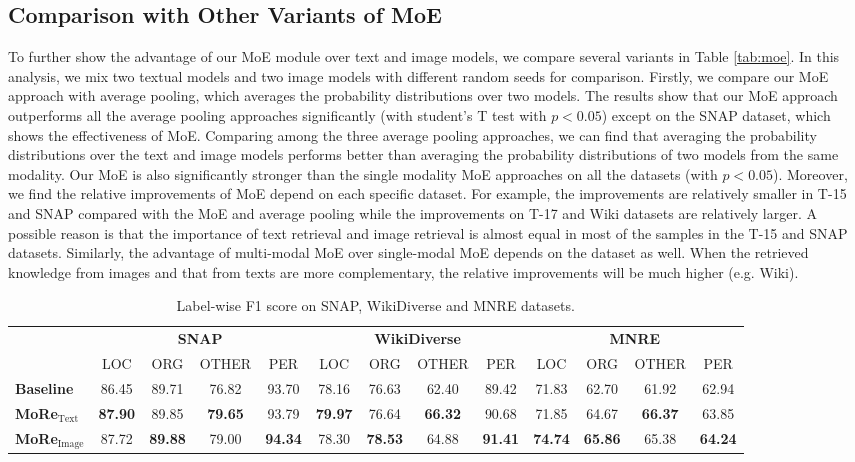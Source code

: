 \documentclass[11pt]{article}
\begin{document}
\subsection{Comparison with Other Variants of MoE}
To further show the advantage of our MoE module over text and image models, we compare several variants in Table \ref{tab:moe}. In this analysis, we mix two textual models and two image models with different random seeds for comparison. Firstly, we compare our MoE approach with average pooling, which averages the probability distributions over two models. The results show that our MoE approach outperforms all the average pooling approaches significantly (with student's T test with $p<0.05$) except on the SNAP dataset, which shows the effectiveness of MoE. Comparing among the three average pooling approaches, we can find that averaging the probability distributions over the text and image models performs better than averaging the probability distributions of two models from the same modality. Our MoE is also significantly stronger than the single modality MoE approaches on all the datasets (with $p<0.05$). 
Moreover, we find the relative improvements of MoE depend on each specific dataset. For example, the improvements are relatively smaller in T-15 and SNAP compared with the MoE and average pooling while the improvements on T-17 and Wiki datasets are relatively larger. A possible reason is that the importance of text retrieval and image retrieval is almost equal in most of the samples in the T-15 and SNAP datasets. Similarly, the advantage of multi-modal MoE over single-modal MoE depends on the dataset as well. When the retrieved knowledge from images and that from texts are more complementary, the relative improvements will be much higher (e.g. Wiki). 


\begin{table*}[t!]
\small
\setlength\tabcolsep{5pt}
\centering
\begin{tabular}{l|cccc|cccc|cccc}
\toprule
 & \multicolumn{4}{c|}{\textbf{SNAP}} & \multicolumn{4}{c|}{\textbf{WikiDiverse}} & \multicolumn{4}{c}{\textbf{MNRE}}\\
  & LOC   & ORG   & OTHER  & PER   & LOC   & ORG   & OTHER & PER   & LOC   & ORG   & OTHER & PER   \\
\midrule
\textbf{Baseline} & 86.45 & 89.71 & 76.82 & 93.70 & 78.16 & 76.63 & 62.40 & 89.42 & 71.83 & 62.70 & 61.92 & 62.94 \\
\textbf{MoRe}$_{\text{Text}}$  & \textbf{87.90} & 89.85 & \textbf{79.65} & 93.79 & \textbf{79.97} & 76.64 & \textbf{66.32} & 90.68 & 71.85 & 64.67 & \textbf{66.37} & 63.85 \\
\textbf{MoRe}$_{\text{Image}}$ & 87.72 & \textbf{89.88} & 79.00 & \textbf{94.34} & 78.30 & \textbf{78.53} & 64.88 & \textbf{91.41} & \textbf{74.74} & \textbf{65.86} & 65.38 & \textbf{64.24} \\

\bottomrule
\end{tabular}
\caption{Label-wise F1 score on SNAP, WikiDiverse and MNRE datasets.}
\label{tab:labelf1}
\end{table*}
\end{document}
